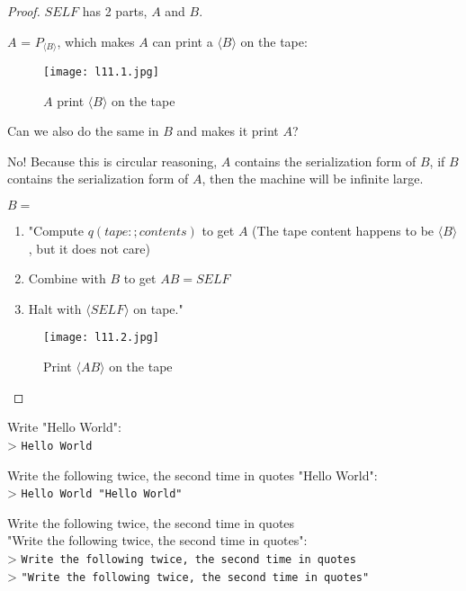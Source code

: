 \begin{proof}
    \(SELF\) has 2 parts, \(A\) and \(B\). 

    \(A\) = \(P_{\langle B \rangle}\), which makes \(A\) can print a \(\langle B \rangle\) on the tape:

    \begin{figure}[H]
        \centering
        \texttt{[image: l11.1.jpg]}
        \caption{\(A\) print \(\langle B \rangle\) on the tape}
    \end{figure}

    \begin{intuition}
        Can we also do the same in \(B\) and makes it print \(A\)? 

        No! Because this is circular reasoning, \(A\) contains the serialization form of \(B\), if \(B\) contains the serialization form of \(A\), then the machine will be infinite large.
    \end{intuition}

    \(B =\) \begin{enumerate}
        \item "Compute \(q(tape :;contents)\)  to get \(A\) (The tape content happens to be \(\langle B \rangle\), but it does not care) 
        \item Combine with \(B\) to get \(AB = SELF\)
        \item Halt with \(\langle SELF \rangle\) on tape."   
    \end{enumerate} 

    \begin{figure}[H]
        \centering
        \texttt{[image: l11.2.jpg]}
        \caption{Print \(\langle AB \rangle\) on the tape}
    \end{figure}
\end{proof}

\begin{example}
    Write "Hello World":\\
    > \verb|Hello World|

    Write the following twice, the second time in quotes "Hello World":\\
    > \verb|Hello World "Hello World"|

    Write the following twice, the second time in quotes\\
    "Write the following twice, the second time in quotes":\\
    > \verb|Write the following twice, the second time in quotes|\\
    > \verb|"Write the following twice, the second time in quotes"|
\end{example}

